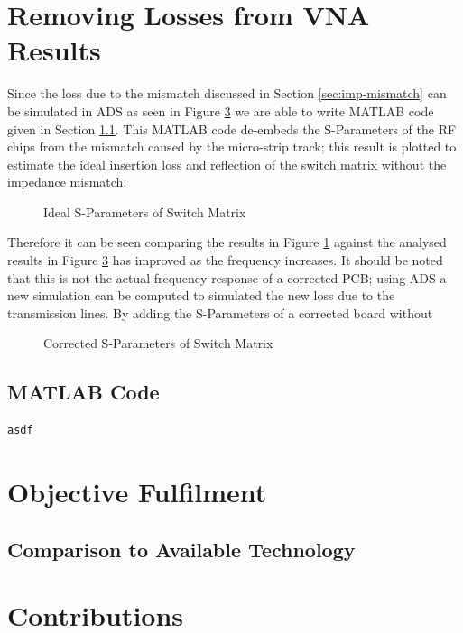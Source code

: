 \documentclass[12pt,openany,a4paper]{book}
\begin{document}
\section{Removing Losses from VNA Results}
Since the loss due to the mismatch discussed in Section \ref{sec:imp-mismatch} can be simulated in ADS as seen in Figure \ref{} we are able to write MATLAB code given in Section \ref{sec:matlab-res}. This MATLAB code de-embeds the S-Parameters of the RF chips from the mismatch caused by the micro-strip track; this result is plotted to estimate the ideal insertion loss and reflection of the switch matrix without the impedance mismatch. 
\begin{figure}[H]
	\centering
	\caption{Ideal S-Parameters of Switch Matrix}
	\label{fig:ideal-switchmatrix}
\end{figure} 
Therefore it can be seen comparing the results in Figure \ref{fig:ideal-switchmatrix} against the analysed results in Figure \ref{} has improved as the frequency increases. It should be noted that this is not the actual frequency response of a corrected PCB; using ADS a new simulation can be computed to simulated the new loss due to the transmission lines. By adding the S-Parameters 
 of a corrected board without 
 
\begin{figure}[H]
	\centering
	\caption{Corrected S-Parameters of Switch Matrix}
	\label{fig:corrected-switchmatrix}
\end{figure} 

\subsection{MATLAB Code} \label{sec:matlab-res}
\begin{lstlisting}
asdf
\end{lstlisting}



\section{Objective Fulfilment}


\subsection{Comparison to Available Technology}


\section{Contributions}
\end{document}

